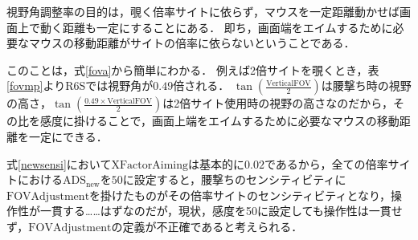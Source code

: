 \documentclass[uplatex, dvipdfmx, ja=standard, a4paper]{bxjsarticle}
\begin{document}
視野角調整率の目的は，覗く倍率サイトに依らず，マウスを一定距離動かせば画面上で動く距離も一定にすることにある．
即ち，画面端をエイムするために必要なマウスの移動距離がサイトの倍率に依らないということである．

このことは，式\eqref{fova}から簡単にわかる．
例えば2倍サイトを覗くとき，表\ref{fovmp}よりR6Sでは視野角が\(0.49\)倍される．
\(\tan \left(\frac{\mathrm{VerticalFOV}}{2}\right)\)は腰撃ち時の視野の高さ，\(\tan \left(\frac{0.49 \times \mathrm{VerticalFOV}}{2}\right)\)は2倍サイト使用時の視野の高さなのだから，その比を感度に掛けることで，画面上端をエイムするために必要なマウスの移動距離を一定にできる．

式\eqref{newsensi}において\(\mathrm{XFactorAiming}\)は基本的に\(0.02\)であるから，全ての倍率サイトにおける\(\mathrm{ADS}_{\mathrm{new}}\)を\(50\)に設定すると，腰撃ちのセンシティビティに\(\mathrm{FOVAdjustment}\)を掛けたものがその倍率サイトのセンシティビティとなり，操作性が一貫する……はずなのだが，現状，感度を50に設定しても操作性は一貫せず，\(\mathrm{FOVAdjustment}\)の定義が不正確であると考えられる．
\end{document}
